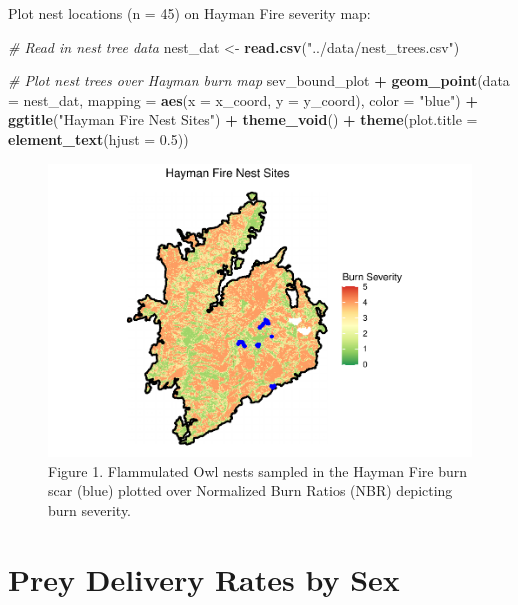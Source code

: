 \documentclass[]{article}
\newenvironment{Shaded}{\begin{snugshade}}{\end{snugshade}}
\newcommand{\CommentTok}[1]{\textcolor[rgb]{0.56,0.35,0.01}{\textit{#1}}}
\newcommand{\DataTypeTok}[1]{\textcolor[rgb]{0.13,0.29,0.53}{#1}}
\newcommand{\FloatTok}[1]{\textcolor[rgb]{0.00,0.00,0.81}{#1}}
\newcommand{\KeywordTok}[1]{\textcolor[rgb]{0.13,0.29,0.53}{\textbf{#1}}}
\newcommand{\NormalTok}[1]{#1}
\newcommand{\OperatorTok}[1]{\textcolor[rgb]{0.81,0.36,0.00}{\textbf{#1}}}
\newcommand{\StringTok}[1]{\textcolor[rgb]{0.31,0.60,0.02}{#1}}
\begin{document}
Plot nest locations (n = 45) on Hayman Fire severity map:

\begin{Shaded}
\begin{Highlighting}[]
\CommentTok{# Read in nest tree data}
\NormalTok{nest_dat <-}\StringTok{ }\KeywordTok{read.csv}\NormalTok{(}\StringTok{"../data/nest_trees.csv"}\NormalTok{)}

\CommentTok{# Plot nest trees over Hayman burn map}
\NormalTok{sev_bound_plot }\OperatorTok{+}
\StringTok{  }\KeywordTok{geom_point}\NormalTok{(}\DataTypeTok{data =}\NormalTok{ nest_dat, }\DataTypeTok{mapping =} \KeywordTok{aes}\NormalTok{(}\DataTypeTok{x =}\NormalTok{ x_coord, }\DataTypeTok{y =}\NormalTok{ y_coord), }\DataTypeTok{color =} \StringTok{"blue"}\NormalTok{) }\OperatorTok{+}
\StringTok{  }\KeywordTok{ggtitle}\NormalTok{(}\StringTok{"Hayman Fire Nest Sites"}\NormalTok{) }\OperatorTok{+}
\StringTok{  }\KeywordTok{theme_void}\NormalTok{() }\OperatorTok{+}
\StringTok{  }\KeywordTok{theme}\NormalTok{(}\DataTypeTok{plot.title =} \KeywordTok{element_text}\NormalTok{(}\DataTypeTok{hjust =} \FloatTok{0.5}\NormalTok{))}
\end{Highlighting}
\end{Shaded}

\begin{figure}
\centering
\includegraphics{../manuscript/figures/plot_severity.pdfplot_severity-1.pdf}
\caption{Figure 1. Flammulated Owl nests sampled in the Hayman Fire burn
scar (blue) plotted over Normalized Burn Ratios (NBR) depicting burn
severity.}
\end{figure}

\hypertarget{prey-delivery-rates-by-sex}{%
\section{Prey Delivery Rates by Sex}\label{prey-delivery-rates-by-sex}}
\end{document}
